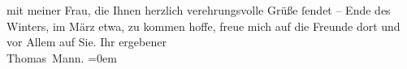 \begin{ledgroupsized}[t]{13cm}
                    mit meiner Frau, die Ihnen
                    herzlich verehrungsvolle Grüße ſendet – Ende des Winters, im März
                    etwa, zu kommen hoffe, freue mich auf die Freunde dort und vor Allem auf
                    Sie.\pend
           \pstart
           Ihr ergebener{\\[\baselineskip]}\spacefill\mbox{Thomas Mann.}\pend
           \leftskip=0em{}\endnumbering{}\end{ledgroupsized}  \newcommand{\dateiname}{L02405}\newcommand{\titel}{Thomas Mann an Arthur Schnitzler, 22. 11. 1923}\newcommand{\editorInnen}{Martin Anton Müller und Gerd-Hermann Susen}
      